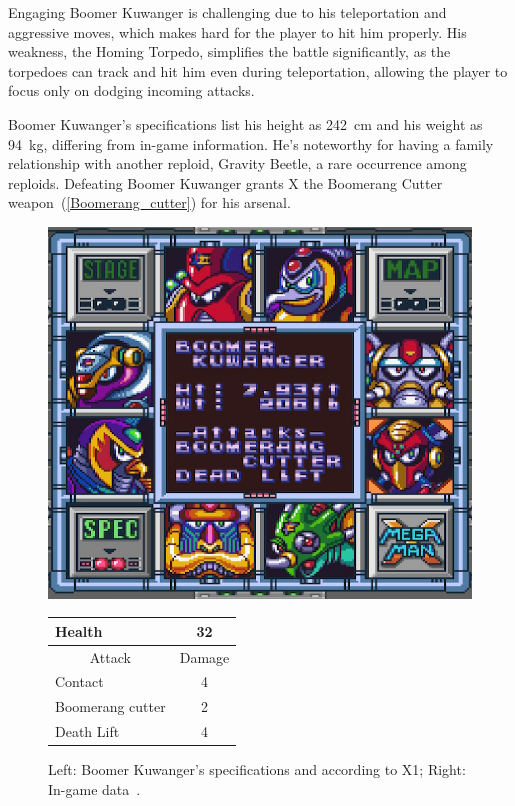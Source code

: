 Engaging Boomer Kuwanger is challenging due to his teleportation and aggressive moves, which makes hard for the player to hit him properly. His weakness, the Homing Torpedo, simplifies the battle significantly, as the torpedoes can track and hit him even during teleportation, allowing the player to focus only on dodging incoming attacks.

Boomer Kuwanger's specifications list his height as 242~cm and his weight as 94~kg, differing from in-game information. He's noteworthy for having a family relationship with another reploid, Gravity Beetle, a rare occurrence among reploids. Defeating Boomer Kuwanger grants X the Boomerang Cutter weapon~(\ref{Boomerang_cutter}) for his arsenal.
\begin{figure}[htp]
	\begin{minipage}[c]{0.45\linewidth}
		\vspace{0pt}
		\centering
		\includegraphics[width=\linewidth]{figures/X1/Boomer_kuwanger/Boomer_kuwanger_specs.png}
	\end{minipage}
	\begin{minipage}[c]{0.45\linewidth}
		\centering
		\vspace{0pt}
		\begin{tabular}[h]{l c}
			\toprule
			Health  & 32\\
			\midrule
			\multicolumn{1}{c}{Attack} & \multicolumn{1}{c}{Damage}\\
			Contact & 4\\
			Boomerang cutter& 2\\
			Death Lift & 4\\
			\bottomrule
		\end{tabular}
	\end{minipage}
	\caption{Left: Boomer Kuwanger's specifications and according to X1; Right: In-game data~\cite{wiki:Boomer_kuwanger}. }
	\label{Kuwanger_specs}
\end{figure}


